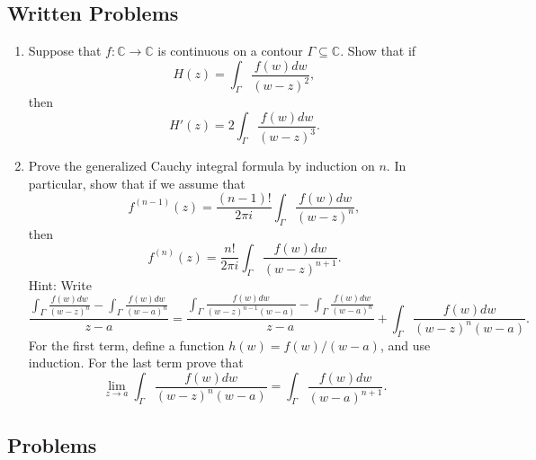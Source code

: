 \documentclass[11pt]{article}
\newcommand{\CC}{\mathbb{C}}
\begin{document}

\subsection*{Written Problems}
\begin{enumerate}
\item Suppose that $f:\CC\rightarrow \CC$ is continuous on a contour $\Gamma\subseteq \CC$.  Show that if 
$$H(z)=\int_\Gamma \frac{f(w)dw}{(w-z)^2},$$
then 
$$H'(z)=2\int_\Gamma \frac{f(w)dw}{(w-z)^3}.$$
\item Prove the generalized Cauchy integral formula by induction on $n$.  In particular, show that if we assume that 
$$f^{(n-1)}(z)=\frac{(n-1)!}{2\pi i}\int_\Gamma \frac{f(w)dw}{(w-z)^{n}},$$
then 
$$f^{(n)}(z)=\frac{n!}{2\pi i}\int_\Gamma \frac{f(w)dw}{(w-z)^{n+1}}.$$
Hint: Write
$$\frac{\int_\Gamma \frac{f(w)dw}{(w-z)^{n}}-\int_\Gamma \frac{f(w)dw}{(w-a)^{n}}}{z-a}=\frac{\int_\Gamma \frac{f(w)dw}{(w-z)^{n-1}(w-a)}-\int_\Gamma \frac{f(w)dw}{(w-a)^{n}}}{z-a}+\int_\Gamma \frac{f(w)dw}{(w-z)^{n}(w-a)}.$$
For the first term, define a function $h(w)=f(w)/(w-a)$, and use induction.  For the last term prove that 
$$\lim_{z\rightarrow a} \int_\Gamma \frac{f(w)dw}{(w-z)^{n}(w-a)}=\int_\Gamma \frac{f(w)dw}{(w-a)^{n+1}}.$$
\end{enumerate}

\subsection*{Problems}
\end{document}
